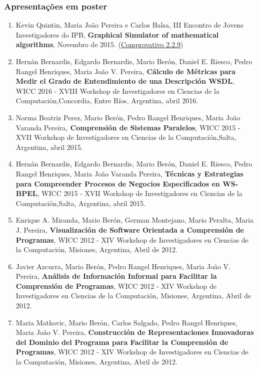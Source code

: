 \documentclass[11pt]{article}
\begin{document}
\subsubsection{Apresentações em poster}
\begin{enumerate}
\item {Kevin Quintin, Maria João Pereira e Carlos Balsa, III Encontro de Jovens Investigadores do IPB, {\bf{ Graphical Simulator of mathematical algorithms}}, Novembro de 2015. (\href{run:Publicacoes/CertificadoEJI.pdf}{Comprovativo 2.2.9})}

\item {Hernán Bernardis, Edgardo Bernardis, Mario Berón, Daniel E. Riesco, Pedro Rangel Henriques, Maria João V. Pereira,{\bf{ Cálculo de Métricas para Medir el Grado de Entendimiento de una Descripción WSDL}}, WICC 2016 - XVIII Workshop de Investigadores en Ciencias de la Computación,Concordia, Entre Ríos, Argentina, abril 2016. }

\item {Norma Beatriz Perez, Mario Berón, Pedro Rangel Henriques, Maria João Varanda Pereira,{\bf{ Comprensión de Sistemas Paralelos}}, WICC 2015 - XVII Workshop de Investigadores en Ciencias de la Computación,Salta, Argentina, abril 2015. }

\item {Hernán Bernardis, Edgardo Bernardis, Mario Berón, Daniel E. Riesco, Pedro Rangel Henriques, Maria João Varanda Pereira, {\bf{ Técnicas y Estrategias para Compreender Procesos de Negocios Especificados en WS-BPEL}}, WICC 2015 - XVII Workshop de Investigadores en Ciencias de la Computación,Salta, Argentina, abril 2015.}

\item {Enrique A. Miranda, Mario Berón, German Montejano, Mario Peralta, Maria J. Pereira, {\bf{ Visualización de Software Orientada a Comprensión de Programas}}, WICC 2012 - XIV Workshop de Investigadores en Ciencias de la Computación, Misiones, Argentina, Abril de 2012. }

\item {Javier Azcurra, Mario Berón, Pedro Rangel Henriques, Maria João V. Pereira, {\bf{ Análisis de Información Informal para Facilitar la Comprensión de Programas}}, WICC 2012 - XIV Workshop de Investigadores en Ciencias de la Computación, Misiones, Argentina, Abril de 2012. }

\item {Maria Matkovic, Mario Berón, Carlos Salgado, Pedro Rangel Henriques, Maria João V. Pereira, {\bf{ Construcción de Representaciones Innovadoras del Dominio del Programa para Facilitar la Comprensión de Programas}}, WICC 2012 - XIV Workshop de Investigadores en Ciencias de la Computación, Misiones, Argentina, Abril de 2012. }


\end{enumerate}
\end{document}
